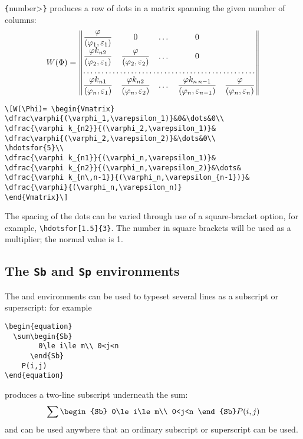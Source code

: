 \verb"{"\<number>\verb"}" produces a row of dots in a matrix
spanning the given number of columns:
\[W(\Phi)= \begin{Vmatrix}
\dfrac\varphi{(\varphi_1,\varepsilon_1)}&0&\dots&0\\
\dfrac{\varphi k_{n2}}{(\varphi_2,\varepsilon_1)}&
\dfrac\varphi{(\varphi_2,\varepsilon_2)}&\dots&0\\
\hdotsfor{5}\\
\dfrac{\varphi k_{n1}}{(\varphi_n,\varepsilon_1)}&
\dfrac{\varphi k_{n2}}{(\varphi_n,\varepsilon_2)}&\dots&
\dfrac{\varphi k_{n\,n-1}}{(\varphi_n,\varepsilon_{n-1})}&
\dfrac{\varphi}{(\varphi_n,\varepsilon_n)}
\end{Vmatrix}\]
\begin{verbatim}
\[W(\Phi)= \begin{Vmatrix}
\dfrac\varphi{(\varphi_1,\varepsilon_1)}&0&\dots&0\\
\dfrac{\varphi k_{n2}}{(\varphi_2,\varepsilon_1)}&
\dfrac\varphi{(\varphi_2,\varepsilon_2)}&\dots&0\\
\hdotsfor{5}\\
\dfrac{\varphi k_{n1}}{(\varphi_n,\varepsilon_1)}&
\dfrac{\varphi k_{n2}}{(\varphi_n,\varepsilon_2)}&\dots&
\dfrac{\varphi k_{n\,n-1}}{(\varphi_n,\varepsilon_{n-1})}&
\dfrac{\varphi}{(\varphi_n,\varepsilon_n)}
\end{Vmatrix}\]
\end{verbatim}
The spacing of the dots can be varied through use of a square-bracket
option, for example, \verb"\hdotsfor[1.5]{3}".  The number in square brackets
will be used as a multiplier; the normal value is 1.

\subsection{The {\tt Sb} and {\tt Sp} environments}

The  and  environments can be used to typeset several
lines as a subscript or superscript:
for example
\begin{verbatim}
\begin{equation}
  \sum\begin{Sb}
        0\le i\le m\\ 0<j<n
      \end{Sb}
    P(i,j)
\end{equation}
\end{verbatim}
produces a two-line subscript underneath the sum:
\begin{equation}
  \sum\begin{Sb}
        0\le i\le m\\ 0<j<n
      \end{Sb}
    P(i,j)
\end{equation}
 and  can be used anywhere that an ordinary subscript or
superscript can be used.

